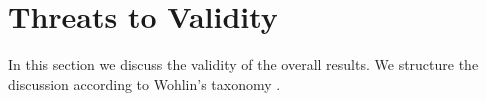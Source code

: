 \documentclass[10pt,journal,letterpaper,compsoc]{IEEEtran}
\begin{document}
\section{Threats to Validity}
\label{valt}

In this section we discuss the validity of the overall results. %
We structure the discussion according to Wohlin's taxonomy \cite{Wohlin2000}.


\end{document}
